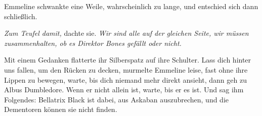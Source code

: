 Emmeline schwankte eine Weile, wahrscheinlich zu lange, und entschied sich
dann schließlich.

\emph{Zum Teufel damit,} dachte sie. \emph{Wir sind alle auf der gleichen Seite,
wir müssen zusammenhalten, ob es Direktor Bones gefällt oder nicht.}

Mit einem Gedanken flatterte ihr Silberspatz auf ihre Schulter. \glqq{}Lass dich
hinter uns fallen, um den Rücken zu decken\grqq{}, murmelte Emmeline leise, fast
ohne ihre Lippen zu bewegen, \glqq{}warte, bis dich niemand mehr direkt ansieht,
dann geh zu Albus Dumbledore. Wenn er nicht allein ist, warte, bis er es ist.
Und sag ihm Folgendes: Bellatrix Black ist dabei, aus Askaban auszubrechen, und
die Dementoren können sie nicht finden.\grqq{}

